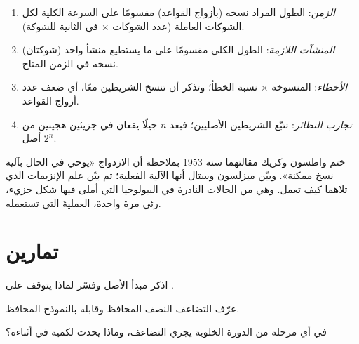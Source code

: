 \begin{method}\label{met:g11:dna-replication:calc}
\begin{enumerate}
  \item \emph{الزمن}: الطول المراد نسخه (بأزواج القواعد) مقسومًا على
        السرعة الكلية لكل الشوكات العاملة (عدد الشوكات $\times$
         في الثانية للشوكة).
  \item \emph{المنشآت اللازمة}: الطول الكلي مقسومًا على ما يستطيع
        منشأ واحد (شوكتان) نسخه في الزمن المتاح.
  \item \emph{الأخطاء}:  المنسوخة $\times$ نسبة الخطأ؛
        وتذكر أن  تنسخ الشريطين معًا، أي ضعف عدد أزواج القواعد.
  \item \emph{تجارب النظائر}: تتبّع الشريطين الأصليين؛ فبعد $n$ جيلًا
        يقعان في جزيئين هجينين من أصل $2^n$.
\end{enumerate}
\end{method}

\begin{remark}\label{rem:g11:dna-replication:fit}
ختم واطسون وكريك مقالتهما سنة 1953 بملاحظة أن الازدواج «يوحي في الحال
بآلية نسخ ممكنة». وبيّن ميزلسون وستال أنها الآلية الفعلية؛ ثم بيّن علم
الإنزيمات الذي تلاهما كيف تعمل. وهي من الحالات النادرة في البيولوجيا
التي أملى فيها شكل جزيء، رئي مرة واحدة، العمليةَ التي تستعمله.
\end{remark}

\section{تمارين}

\begin{exercise}[$\star$]\label{exo:g11:dna-replication:1}
اذكر مبدأ الأصل وفسّر لماذا يتوقف على .
\end{exercise}

\begin{exercise}[$\star$]\label{exo:g11:dna-replication:2}
عرّف التضاعف النصف المحافظ وقابله بالنموذج المحافظ.
\end{exercise}

\begin{exercise}[$\star$]\label{exo:g11:dna-replication:3}
في أي مرحلة من الدورة الخلوية يجري التضاعف، وماذا يحدث لكمية  في
 أثناءه؟
\end{exercise}

